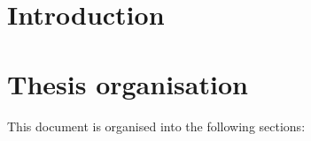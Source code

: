 \section{Introduction}


\section{Thesis organisation}

This document is organised into the following sections: